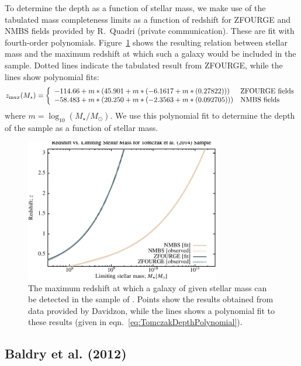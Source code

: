 To determine the depth as a function of stellar mass, we make use of the tabulated mass completeness limits as a function of redshift for ZFOURGE and NMBS fields provided by R.~Quadri (private communication). These are fit with fourth-order polynomials. Figure~\ref{fig:Tomczak2014DepthFit} shows the resulting relation between stellar mass and the maximum redshift at which such a galaxy would be included in the sample. Dotted lines indicate the tabulated result from ZFOURGE, while the lines show polynomial fits:
\begin{equation}
 z_{\mathrm max}(M_\star) = \left\{ \begin{array}{ll} -114.66+m*(45.901+m*(-6.1617+m*(0.27822))) & \hbox{ZFOURGE fields} \\ -58.483+m*(20.250+m*(-2.3563+m*(0.092705))) & \hbox{NMBS fields} \end{array} \right.
 \label{eq:TomczakDepthPolynomial}
\end{equation}
where $m= \log_{10}(M_\star/M_\odot)$. We use this polynomial fit to determine the depth of the sample as a function of stellar mass.

\begin{figure}
 \begin{center}
 \includegraphics[width=85mm,trim=0mm 0mm 0mm 4mm,clip]{Plots/DataAnalysis/TomczakZFOURGEMassRedshiftRelation.pdf}
 \end{center}
 \caption{The maximum redshift at which a galaxy of given stellar mass can be detected in the sample of \protect\cite{tomczak_galaxy_2014}. Points show the results obtained from data provided by Davidzon, while the lines shows a polynomial fit to these results (given in eqn.~\ref{eq:TomczakDepthPolynomial}).}
 \label{fig:Tomczak2014DepthFit}
\end{figure}

\subsection{Baldry et al. (2012)}\label{phys:surveyGeometry:surveyGeometryBaldry2012GAMA}

